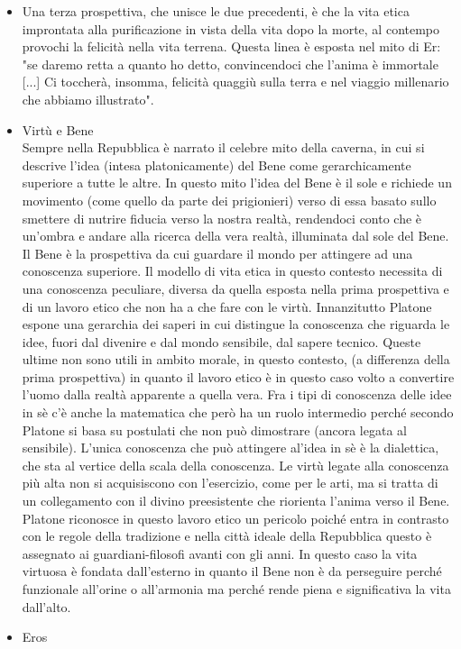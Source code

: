 \documentclass[10pt,a4paper]{article}
\begin{document}
\begin{itemize}
	\item Una terza prospettiva, che unisce le due precedenti, è che la vita etica improntata alla purificazione in vista della vita dopo la morte, al contempo provochi la felicità nella vita terrena. Questa linea è esposta nel mito di Er: "se daremo retta a quanto ho detto, convincendoci che l'anima è immortale [...] Ci toccherà, insomma, felicità quaggiù sulla terra e nel viaggio millenario che abbiamo illustrato". 
	\item Virtù e Bene\\
	Sempre nella Repubblica è narrato il celebre mito della caverna, in cui si descrive l'idea (intesa platonicamente) del Bene come gerarchicamente superiore a tutte le altre. In questo mito l'idea del Bene è il sole e richiede un movimento (come quello da parte dei prigionieri) verso di essa basato sullo smettere di nutrire fiducia verso la nostra realtà, rendendoci conto che è un'ombra e andare alla ricerca della vera realtà, illuminata dal sole del Bene. Il Bene è la prospettiva da cui guardare il mondo per attingere ad una conoscenza superiore. Il modello di vita etica in questo contesto necessita di una conoscenza peculiare, diversa da quella esposta nella prima prospettiva e di un lavoro etico che non ha a che fare con le virtù. Innanzitutto Platone espone una gerarchia dei saperi in cui distingue la conoscenza che riguarda le idee, fuori dal divenire e dal mondo sensibile, dal sapere tecnico. Queste ultime non sono utili in ambito morale, in questo contesto, (a differenza della prima prospettiva) in quanto il lavoro etico è in questo caso volto a convertire l'uomo dalla realtà apparente a quella vera. Fra i tipi di conoscenza delle idee in sè c'è anche la matematica che però ha un ruolo intermedio perché secondo Platone si basa su postulati che non può dimostrare (ancora legata al sensibile). L'unica conoscenza che può attingere al'idea in sè è la dialettica, che sta al vertice della scala della conoscenza. Le virtù legate alla conoscenza più alta non si acquisiscono con l'esercizio, come per le arti, ma si tratta di un collegamento con il divino preesistente che riorienta l'anima verso il Bene. Platone riconosce in questo lavoro etico un pericolo poiché entra in contrasto con le regole della tradizione e nella città ideale della Repubblica questo è assegnato ai guardiani-filosofi avanti con gli anni. In questo caso la vita virtuosa è fondata dall'esterno in quanto il Bene non è da perseguire perché funzionale all'orine o all'armonia ma perché rende piena e significativa la vita dall'alto. 
	\item Eros\\

\end{itemize}
\end{document}
